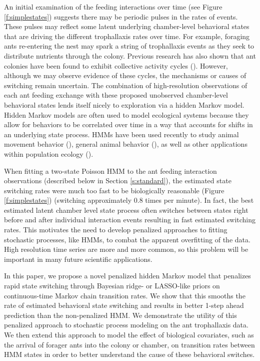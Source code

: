 \documentclass[cmbright,fleqn,referee]{envauth}
\begin{document}
	An initial examination of the feeding interactions over time (see Figure \ref{f:simplestates}) suggests there may be periodic pulses in the rates of events. These pulses may reflect some latent underlying chamber-level behavioral states that are driving the different trophallaxis rates over time. For example, foraging ants re-entering the nest may spark a string of trophallaxis events as they seek to distribute nutrients through the colony. Previous research has also shown that ant colonies have been found to exhibit collective activity cycles (\cite{Richardson2017}). However, although we may observe evidence of these cycles, the mechanisms or causes of switching remain uncertain. The combination of high-resolution observations of each ant feeding exchange with these proposed unobserved chamber-level behavioral states lends itself nicely to exploration via a hidden Markov model. Hidden Markov models are often used to model ecological systems because they allow for behaviors to be correlated over time in a way that accounts for shifts in an underlying state process. HMMs have been used recently  to study animal movement behavior (\cite{Langrock2012,McKellar2015, Patterson2017,Towner2016, VandeKerk2015}), general animal behavior (\cite{DeRuiter2016,Langrock2014,Schliehe-Diecks2012}), as well as other applications within population ecology (\cite{Borchers2013,Gimenez2014, Johnson2016, Leos-Barajas2017a}). 
    
    When fitting a two-state Poisson HMM to the ant feeding interaction observations (described below in Section \ref{s:standard}), the estimated state switching rates were much too fast to be biologically reasonable (Figure \ref{f:simplestates}) (switching approximately 0.8 times per minute). In fact, the best estimated latent chamber level state process often switches between states right before and after individual interaction events resulting in fast estimated switching rates. This motivates the need to develop penalized approaches to fitting stochastic processes, like HMMs, to combat the apparent overfitting of the data. High resolution time series are more and more common, so this problem will be important in many future scientific applications. 

In this paper, we propose a novel penalized hidden Markov model that penalizes rapid state switching through  Bayesian ridge- or LASSO-like priors on continuous-time Markov chain transition rates. We show that this smooths the rate of estimated behavioral state switching and results in better 1-step ahead prediction than the non-penalized HMM. We demonstrate the utility of this penalized approach to stochastic process modeling on the ant trophallaxis data. We then extend this approach to model the effect of biological covariates, such as the arrival of forager ants into the colony or chamber, on transition rates between HMM states in order to better understand the cause of these behavioral switches. 
\end{document}
